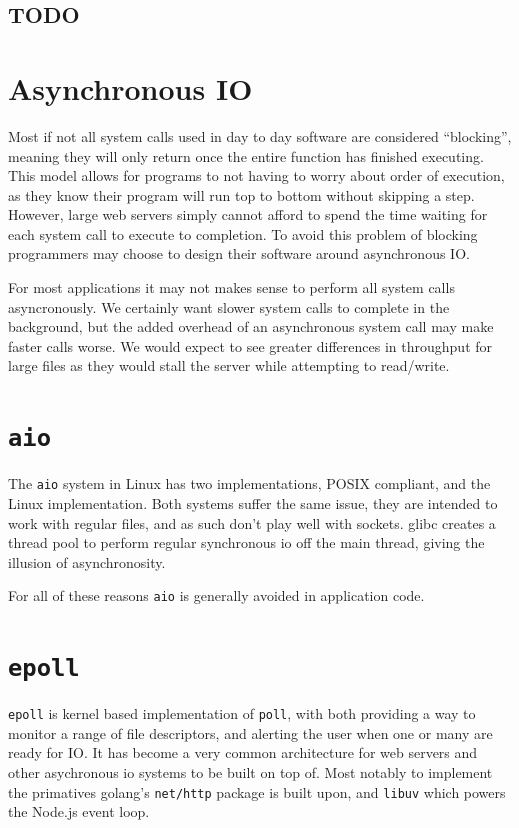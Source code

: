 \documentclass[letterpaper, 10pt, twocolumn]{article}
\begin{document}
\subsection{TODO}
\label{sec:org17caff1}

\section{Asynchronous IO}
\label{sec:orgf67f812}
Most if not all system calls used in day to day software are considered ``blocking'', meaning they will only return once the entire function has finished executing. This model allows for programs to not having to worry about order of execution, as they know their program will run top to bottom without skipping a step. However, large web servers simply cannot afford to spend the time waiting for each system call to execute to completion. To avoid this problem of blocking programmers may choose to design their software around asynchronous IO.

For most applications it may not makes sense to perform all system calls asyncronously. We certainly want slower system calls to complete in the background, but the added overhead of an asynchronous system call may make faster calls worse. We would expect to see greater differences in throughput for large files as they would stall the server while attempting to read/write.

\section{\texttt{aio}}
\label{sec:org2e7ac2d}
The \texttt{aio} system in Linux has two implementations, POSIX compliant, and the Linux implementation. Both systems suffer the same issue, they are intended to work with regular files, and as such don't play well with sockets. glibc creates a thread pool to perform regular synchronous io off the main thread, giving the illusion of asynchronosity.

For all of these reasons \texttt{aio} is generally avoided in application code.

\section{\texttt{epoll}}
\label{sec:org5629691}
\texttt{epoll} is kernel based implementation of \texttt{poll}, with both providing a way to monitor a range of file descriptors, and alerting the user when one or many are ready for IO. It has become a very common architecture for web servers and other asychronous io systems to be built on top of. Most notably to implement the primatives golang's \texttt{net/http} package is built upon, and \texttt{libuv} which powers the Node.js event loop.
\end{document}
